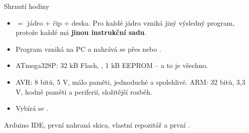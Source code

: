\documentclass[12pt,aspectratio=169]{beamer}
\begin{document}
\begin{keyframe}{Shrnutí hodiny}
  \footnotesize
  \begin{itemize}\itemsep2pt
    \item {} $=$ jádro $+$ čip $+$ deska. Pro každé jádro vzniká jiný
          výsledný program, protože každé má \textbf{jinou instrukční sadu}.
    \item Program vzniká  na PC a nahrává se přes
           nebo .
    \item ATmega328P: 32 kB Flash, , 1 kB EEPROM -- a to je všechno.
    \item AVR: 8 bitů, 5 V, málo paměti, jednoduché a spolehlivé.
          ARM: 32 bitů, 3,3 V, hodně paměti a periferií, složitější rozběh.
    \item Vybírá se .
  \end{itemize}
  \vfill
   Arduino IDE, první nahraná skica, vlastní repozitář a první
  .
\end{keyframe}
\end{document}
